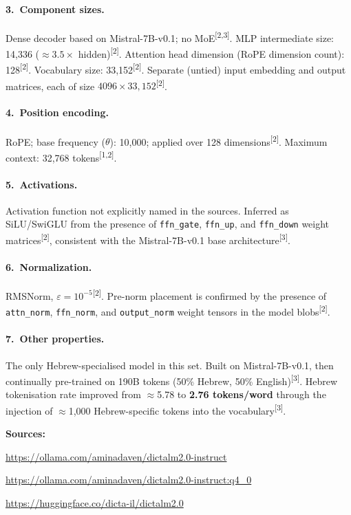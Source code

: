 \documentclass[11pt, a4paper]{article}
\newcommand{\src}[1]{\textsuperscript{\normalfont\small[#1]}}
\begin{document}
\paragraph{3.~Component sizes.}
Dense decoder based on Mistral-7B-v0.1; no MoE\src{2,3}.
MLP intermediate size: 14,336 ($\approx3.5\times$ hidden)\src{2}.
Attention head dimension (RoPE dimension count): 128\src{2}.
Vocabulary size: 33,152\src{2}.
Separate (untied) input embedding and output matrices, each of size
$4096\times33{,}152$\src{2}.

\paragraph{4.~Position encoding.}
RoPE; base frequency ($\theta$): 10,000; applied over 128 dimensions\src{2}.
Maximum context: 32,768 tokens\src{1,2}.

\paragraph{5.~Activations.}
Activation function not explicitly named in the sources.
Inferred as SiLU/SwiGLU from the presence of \texttt{ffn\_gate},
\texttt{ffn\_up}, and \texttt{ffn\_down} weight matrices\src{2}, consistent with
the Mistral-7B-v0.1 base architecture\src{3}.

\paragraph{6.~Normalization.}
RMSNorm, $\varepsilon=10^{-5}$\src{2}.
Pre-norm placement is confirmed by the presence of \texttt{attn\_norm},
\texttt{ffn\_norm}, and \texttt{output\_norm} weight tensors in the model
blobs\src{2}.

\paragraph{7.~Other properties.}
The only Hebrew-specialised model in this set.
Built on Mistral-7B-v0.1, then continually pre-trained on 190B tokens
(50\% Hebrew, 50\% English)\src{3}.
Hebrew tokenisation rate improved from $\approx$5.78 to \textbf{2.76
tokens/word} through the injection of $\approx$1,000 Hebrew-specific tokens into
the vocabulary\src{3}.

\noindent\textbf{Sources:}
\begin{enumerate}[noitemsep,label=\small{[\arabic*]},leftmargin=*,topsep=2pt]
\item \small\url{https://ollama.com/aminadaven/dictalm2.0-instruct}
\item \small\url{https://ollama.com/aminadaven/dictalm2.0-instruct:q4_0}
\item \small\url{https://huggingface.co/dicta-il/dictalm2.0}
\end{enumerate}
\end{document}
